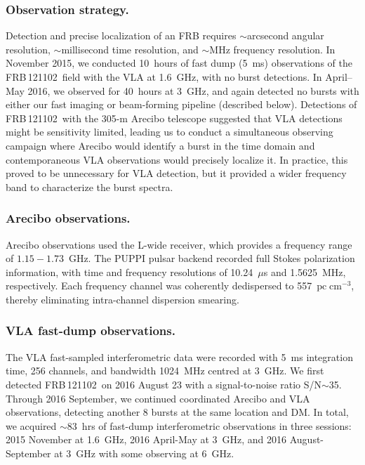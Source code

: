 \documentclass{nature_frb}
\newcommand{\frb}{FRB\,121102}
\newcommand{\dmu}{\ensuremath{\mathrm{pc\; cm^{-3}}}}
\begin{document}
\subsubsection*{Observation strategy.}
Detection and precise localization of an FRB requires $\sim$arcsecond angular resolution, $\sim$milli\-second time resolution, and $\sim$MHz frequency resolution.  In November 2015, we conducted 10~hours of fast dump (5~ms) observations of the \frb\ field with the VLA\cite{ssh+16b} at 1.6~GHz, with no burst detections. In April--May 2016, we observed for 40~hours at 3~GHz, and again detected no bursts with either our fast imaging or beam-forming pipeline (described below).  Detections of \frb\ with the 305-m Arecibo telescope\cite{ssh+16a,ssh+16b} suggested that VLA detections might be sensitivity limited, leading us to conduct a simultaneous observing campaign where Arecibo would identify a burst in the time domain and contemporaneous VLA observations would precisely localize it.  In practice, this proved to be unnecessary for VLA detection, but it provided a wider frequency band to characterize the burst spectra.

\subsubsection*{Arecibo observations.}
Arecibo observations used the L-wide receiver, which provides a frequency range of $1.15-1.73$~GHz. The PUPPI pulsar backend recorded full Stokes polarization information, with time and frequency resolutions of 10.24~$\mu$s and 1.5625~MHz, respectively. Each frequency channel was coherently dedispersed to 557~\dmu, thereby eliminating intra-channel dispersion smearing.

\subsubsection*{VLA fast-dump observations.}
The VLA fast-sampled interferometric data were recorded with 5~ms integration time, 256 channels, and bandwidth 1024~MHz centred at 3~GHz. We first detected \frb\ on 2016 August 23 with a signal-to-noise ratio S/N$\sim$35. Through 2016 September, we continued coordinated Arecibo and VLA observations, detecting another 8 bursts at the same location and DM. In total, we acquired $\sim$83~hrs of fast-dump interferometric observations in three sessions: 2015 November\cite{ssh+16b} at 1.6~GHz, 2016 April-May at 3~GHz, and 2016 August-September at 3~GHz with some observing at 6~GHz.
\end{document}
